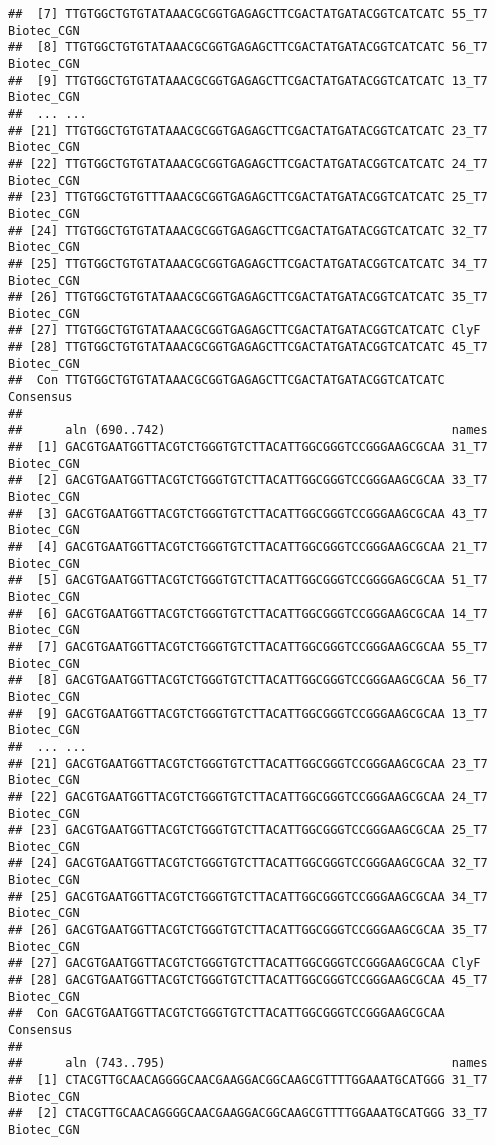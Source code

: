 \documentclass[
]{article}
\begin{document}
\begin{verbatim}
##  [7] TTGTGGCTGTGTATAAACGCGGTGAGAGCTTCGACTATGATACGGTCATCATC 55_T7 Biotec_CGN
##  [8] TTGTGGCTGTGTATAAACGCGGTGAGAGCTTCGACTATGATACGGTCATCATC 56_T7 Biotec_CGN
##  [9] TTGTGGCTGTGTATAAACGCGGTGAGAGCTTCGACTATGATACGGTCATCATC 13_T7 Biotec_CGN 
##  ... ...
## [21] TTGTGGCTGTGTATAAACGCGGTGAGAGCTTCGACTATGATACGGTCATCATC 23_T7 Biotec_CGN
## [22] TTGTGGCTGTGTATAAACGCGGTGAGAGCTTCGACTATGATACGGTCATCATC 24_T7 Biotec_CGN
## [23] TTGTGGCTGTGTTTAAACGCGGTGAGAGCTTCGACTATGATACGGTCATCATC 25_T7 Biotec_CGN
## [24] TTGTGGCTGTGTATAAACGCGGTGAGAGCTTCGACTATGATACGGTCATCATC 32_T7 Biotec_CGN
## [25] TTGTGGCTGTGTATAAACGCGGTGAGAGCTTCGACTATGATACGGTCATCATC 34_T7 Biotec_CGN
## [26] TTGTGGCTGTGTATAAACGCGGTGAGAGCTTCGACTATGATACGGTCATCATC 35_T7 Biotec_CGN
## [27] TTGTGGCTGTGTATAAACGCGGTGAGAGCTTCGACTATGATACGGTCATCATC ClyF
## [28] TTGTGGCTGTGTATAAACGCGGTGAGAGCTTCGACTATGATACGGTCATCATC 45_T7 Biotec_CGN
##  Con TTGTGGCTGTGTATAAACGCGGTGAGAGCTTCGACTATGATACGGTCATCATC Consensus 
## 
##      aln (690..742)                                        names
##  [1] GACGTGAATGGTTACGTCTGGGTGTCTTACATTGGCGGGTCCGGGAAGCGCAA 31_T7 Biotec_CGN
##  [2] GACGTGAATGGTTACGTCTGGGTGTCTTACATTGGCGGGTCCGGGAAGCGCAA 33_T7 Biotec_CGN
##  [3] GACGTGAATGGTTACGTCTGGGTGTCTTACATTGGCGGGTCCGGGAAGCGCAA 43_T7 Biotec_CGN
##  [4] GACGTGAATGGTTACGTCTGGGTGTCTTACATTGGCGGGTCCGGGAAGCGCAA 21_T7 Biotec_CGN
##  [5] GACGTGAATGGTTACGTCTGGGTGTCTTACATTGGCGGGTCCGGGGAGCGCAA 51_T7 Biotec_CGN
##  [6] GACGTGAATGGTTACGTCTGGGTGTCTTACATTGGCGGGTCCGGGAAGCGCAA 14_T7 Biotec_CGN
##  [7] GACGTGAATGGTTACGTCTGGGTGTCTTACATTGGCGGGTCCGGGAAGCGCAA 55_T7 Biotec_CGN
##  [8] GACGTGAATGGTTACGTCTGGGTGTCTTACATTGGCGGGTCCGGGAAGCGCAA 56_T7 Biotec_CGN
##  [9] GACGTGAATGGTTACGTCTGGGTGTCTTACATTGGCGGGTCCGGGAAGCGCAA 13_T7 Biotec_CGN 
##  ... ...
## [21] GACGTGAATGGTTACGTCTGGGTGTCTTACATTGGCGGGTCCGGGAAGCGCAA 23_T7 Biotec_CGN
## [22] GACGTGAATGGTTACGTCTGGGTGTCTTACATTGGCGGGTCCGGGAAGCGCAA 24_T7 Biotec_CGN
## [23] GACGTGAATGGTTACGTCTGGGTGTCTTACATTGGCGGGTCCGGGAAGCGCAA 25_T7 Biotec_CGN
## [24] GACGTGAATGGTTACGTCTGGGTGTCTTACATTGGCGGGTCCGGGAAGCGCAA 32_T7 Biotec_CGN
## [25] GACGTGAATGGTTACGTCTGGGTGTCTTACATTGGCGGGTCCGGGAAGCGCAA 34_T7 Biotec_CGN
## [26] GACGTGAATGGTTACGTCTGGGTGTCTTACATTGGCGGGTCCGGGAAGCGCAA 35_T7 Biotec_CGN
## [27] GACGTGAATGGTTACGTCTGGGTGTCTTACATTGGCGGGTCCGGGAAGCGCAA ClyF
## [28] GACGTGAATGGTTACGTCTGGGTGTCTTACATTGGCGGGTCCGGGAAGCGCAA 45_T7 Biotec_CGN
##  Con GACGTGAATGGTTACGTCTGGGTGTCTTACATTGGCGGGTCCGGGAAGCGCAA Consensus 
## 
##      aln (743..795)                                        names
##  [1] CTACGTTGCAACAGGGGCAACGAAGGACGGCAAGCGTTTTGGAAATGCATGGG 31_T7 Biotec_CGN
##  [2] CTACGTTGCAACAGGGGCAACGAAGGACGGCAAGCGTTTTGGAAATGCATGGG 33_T7 Biotec_CGN

\end{verbatim}
\end{document}
